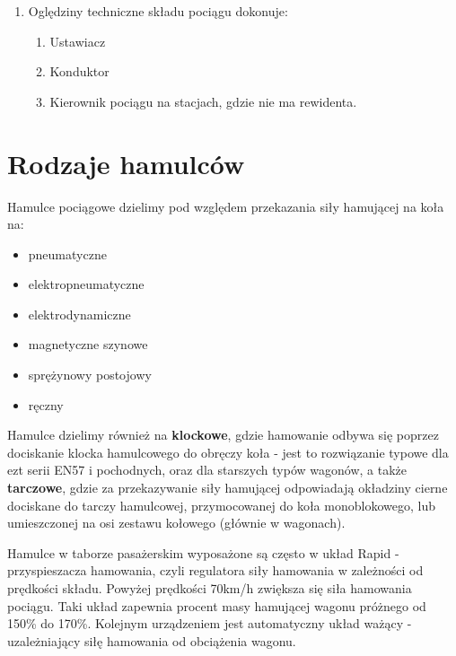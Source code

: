 \begin{tcolorbox}[colback=black!5!white,colframe=white!55!black,title=Sprawdźmy się]
	\begin{enumerate}
		\item Oględziny techniczne składu pociągu dokonuje:
		\begin{enumerate}
			\item Ustawiacz
			\item Konduktor
			\item Kierownik pociągu na stacjach, gdzie nie ma rewidenta.
		\end{enumerate} 
	\end{enumerate}
\end{tcolorbox}

\chapter{Rodzaje hamulców}

Hamulce pociągowe dzielimy pod względem przekazania siły hamującej na koła na:

\begin{itemize}
	\item pneumatyczne
	\item elektropneumatyczne
	\item elektrodynamiczne
	\item magnetyczne szynowe
	\item sprężynowy postojowy
	\item ręczny 
\end{itemize}
Hamulce dzielimy również na \textbf{klockowe}, gdzie hamowanie odbywa się poprzez dociskanie klocka hamulcowego do obręczy koła - jest to rozwiązanie typowe dla ezt serii EN57 i pochodnych, oraz dla starszych typów wagonów, a także \textbf{tarczowe}, gdzie za przekazywanie siły hamującej odpowiadają okładziny cierne dociskane do tarczy hamulcowej, przymocowanej do koła monoblokowego, lub umieszczonej na osi zestawu kołowego (głównie w wagonach).

Hamulce w taborze pasażerskim wyposażone są często w układ Rapid - przyspieszacza hamowania, czyli regulatora siły hamowania w zależności od prędkości składu. Powyżej prędkości 70km/h zwiększa się siła hamowania pociągu. Taki układ zapewnia procent masy hamującej wagonu próżnego od 150\% do 170\%. Kolejnym urządzeniem jest automatyczny układ ważący - uzależniający siłę hamowania od obciążenia wagonu.


